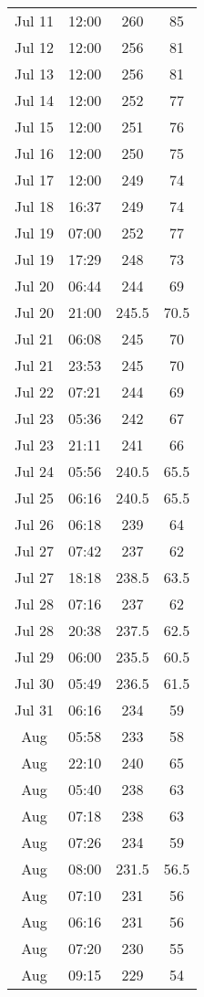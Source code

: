 \documentclass{article}
\begin{document}
\begin{longtable}{|c|c|c|c|}
\hline
Jul 11 & 12:00 & 260 & 85 \\
Jul 12 & 12:00 & 256 & 81 \\
Jul 13 & 12:00 & 256 & 81 \\
Jul 14 & 12:00 & 252 & 77 \\
Jul 15 & 12:00 & 251 & 76 \\
Jul 16 & 12:00 & 250 & 75 \\
Jul 17 & 12:00 & 249 & 74 \\
Jul 18 & 16:37 & 249 & 74 \\
Jul 19 & 07:00 & 252 & 77 \\
Jul 19 & 17:29 & 248 & 73 \\
Jul 20 & 06:44 & 244 & 69 \\
Jul 20 & 21:00 & 245.5 & 70.5 \\
Jul 21 & 06:08 & 245 & 70 \\
Jul 21 & 23:53 & 245 & 70 \\
Jul 22 & 07:21 & 244 & 69 \\
Jul 23 & 05:36 & 242 & 67 \\
Jul 23 & 21:11 & 241 & 66 \\
Jul 24 & 05:56 & 240.5 & 65.5 \\
Jul 25 & 06:16 & 240.5 & 65.5 \\
Jul 26 & 06:18 & 239 & 64 \\
Jul 27 & 07:42 & 237 & 62 \\
Jul 27 & 18:18 & 238.5 & 63.5 \\
Jul 28 & 07:16 & 237 & 62 \\
Jul 28 & 20:38 & 237.5 & 62.5 \\
Jul 29 & 06:00 & 235.5 & 60.5 \\
Jul 30 & 05:49 & 236.5 & 61.5 \\
Jul 31 & 06:16 & 234 & 59 \\
\hline
Aug\:\: 1 & 05:58 & 233 & 58 \\
Aug\:\: 1 & 22:10 & 240 & 65 \\
Aug\:\: 2 & 05:40 & 238 & 63 \\
Aug\:\: 3 & 07:18 & 238 & 63 \\
Aug\:\: 4 & 07:26 & 234 & 59 \\
Aug\:\: 5 & 08:00 & 231.5 & 56.5 \\
Aug\:\: 6 & 07:10 & 231 & 56 \\
Aug\:\: 7 & 06:16 & 231 & 56 \\
Aug\:\: 8 & 07:20 & 230 & 55 \\
Aug\:\: 9 & 09:15 & 229 & 54 \\

\end{longtable}
\end{document}
